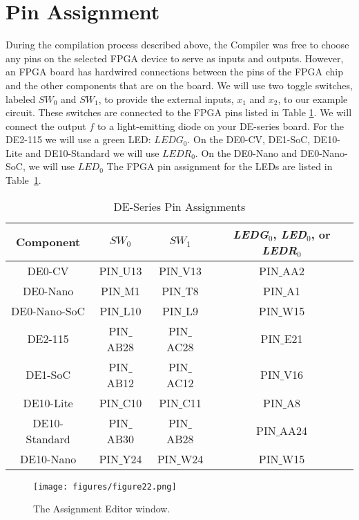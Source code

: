 \section{Pin Assignment}

During the compilation process described above, the Compiler was free to choose any
pins on the selected FPGA device to serve as inputs and outputs. However, an FPGA board
has hardwired connections between the pins of the FPGA chip and the other components that
are on the board.
We will use two toggle switches, labeled $SW_0$ and $SW_1$, to provide the
external inputs, $x_1$ and $x_2$, to our example circuit. These switches are connected
to the FPGA pins listed in Table \ref{tab:pinassign}. We will connect the output $f$ to a
light-emitting diode on your DE-series board. For the DE2-115 we will use a green LED: $LEDG_0$.
On the DE0-CV, DE1-SoC, DE10-Lite and DE10-Standard we will use $LEDR_0$. On the DE0-Nano and DE0-Nano-SoC, we will use $LED_0$
The FPGA pin assignment for the LEDs are listed in Table~\ref{tab:pinassign}.

\begin{table}[H]
\centering
\begin{tabular}{| c | c | c | c |}
\hline
Component & $SW_0$ & $SW_1$ & {\it LEDG}$_0$, {\it LED}$_0$, or {\it LEDR}$_0$ \\
\hline
DE0-CV & PIN$\_$U13 & PIN$\_$V13 & PIN$\_$AA2 \\
\hline
DE0-Nano & PIN$\_$M1 & PIN$\_$T8 & PIN$\_$A1 \\
\hline
DE0-Nano-SoC & PIN$\_$L10 & PIN$\_$L9 & PIN$\_$W15 \\
\hline
DE2-115 & PIN$\_$AB28 & PIN$\_$AC28 & PIN$\_$E21 \\
\hline
DE1-SoC & PIN$\_$AB12 & PIN$\_$AC12 & PIN$\_$V16 \\
\hline
DE10-Lite & PIN$\_$C10 & PIN$\_$C11 & PIN$\_$A8 \\
\hline
DE10-Standard & PIN$\_$AB30 & PIN$\_$AB28 & PIN$\_$AA24 \\
\hline
DE10-Nano & PIN$\_$Y24 & PIN$\_$W24 & PIN$\_$W15 \\
\hline
\end{tabular}
 
\caption{DE-Series Pin Assignments}
\label{tab:pinassign}
\end{table}

\begin{figure}[H]
   \begin{center}
      \texttt{[image: figures/figure22.png]}
   \caption{The Assignment Editor window.} 
	 \label{fig:22}
	 \end{center}
\end{figure}

